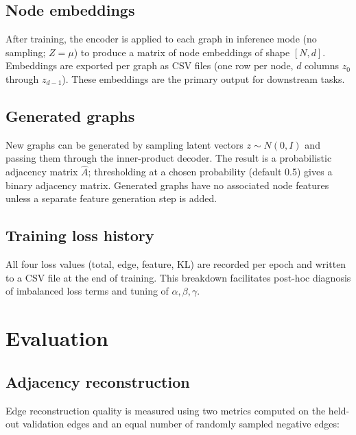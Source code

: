 \documentclass[11pt]{article}
\begin{document}
\subsection{Node embeddings}
After training, the encoder is applied to each graph in inference mode
(no sampling; $Z = \mu$) to produce a matrix of node embeddings
of shape $[N, d]$. Embeddings are exported per graph as CSV files
(one row per node, $d$ columns $z_0$ through $z_{d-1}$). These
embeddings are the primary output for downstream tasks.

\subsection{Generated graphs}
New graphs can be generated by sampling latent vectors
$z \sim N(0, I)$ and passing them through the inner-product
decoder. The result is a probabilistic adjacency matrix $\hat{A}$;
thresholding at a chosen probability (default 0.5) gives a binary
adjacency matrix. Generated graphs have no associated node features
unless a separate feature generation step is added.


\subsection{Training loss history}
All four loss values (total, edge, feature, KL) are recorded per epoch
and written to a CSV file at the end of training. This breakdown
facilitates post-hoc diagnosis of imbalanced loss terms and
tuning of $\alpha, \beta, \gamma$. 



\section{Evaluation}

\subsection{Adjacency reconstruction}
Edge reconstruction quality is measured using two metrics computed on
the held-out validation edges and an equal number of randomly sampled
negative edges:
\end{document}
